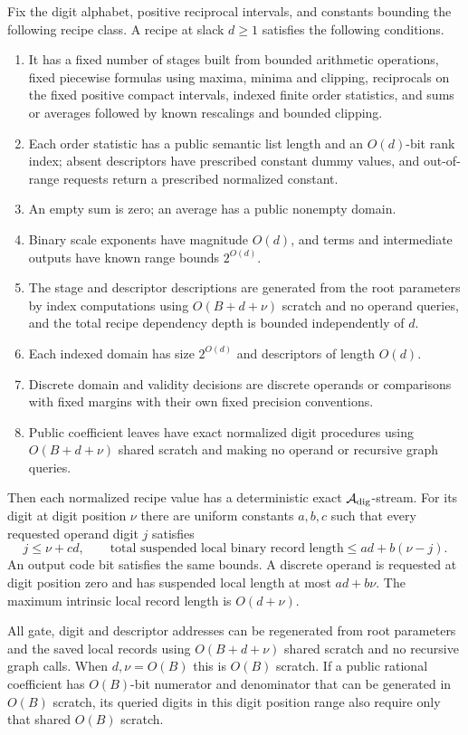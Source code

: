 \begin{theorem}
\label{thm:arith-interface}
Fix the digit alphabet, positive reciprocal intervals, and
constants bounding the following recipe class.  A recipe at
slack $d\geq1$ satisfies the following conditions.
\begin{enumerate}
\item It has a fixed number of stages built from bounded
arithmetic operations, fixed piecewise formulas using maxima,
minima and clipping, reciprocals on the fixed positive compact
intervals, indexed finite order statistics, and sums or averages followed by known
rescalings and bounded clipping.
\item Each order statistic has a public semantic list
length and an $O(d)$-bit rank index; absent descriptors have prescribed
constant dummy values, and out-of-range requests return a prescribed
normalized constant.
\item An empty sum is zero; an average has a public
nonempty domain.
\item Binary scale exponents have magnitude $O(d)$, and
terms and intermediate outputs have known range bounds $2^{O(d)}$.
\item The stage and descriptor
descriptions are generated from the root parameters by index
computations using $O(B+d+\nu)$ scratch and no operand queries, and the
total recipe dependency depth is bounded independently
of $d$.
\item Each indexed domain has size $2^{O(d)}$ and descriptors
of length $O(d)$.
\item Discrete domain and validity decisions are
discrete operands or comparisons with fixed margins with their own fixed
precision conventions.
\item Public coefficient leaves have exact
normalized digit procedures using $O(B+d+\nu)$ shared scratch
and making no operand or recursive graph queries.
\end{enumerate}

Then each normalized recipe value has a deterministic exact
$\mathcal A_{\rm dig}$-stream.  For its digit at digit position $\nu$ there are uniform
constants $a,b,c$ such that every requested operand digit $j$
satisfies
\begin{equation}
 j\leq \nu+cd,\qquad
 \text{total suspended local binary record length}
       \leq ad+b(\nu-j).
 \label{eq:arith-export}
\end{equation}
An output code bit satisfies the same bounds.  A discrete operand
is requested at digit position zero and has suspended local length at
most $ad+b\nu$.  The maximum intrinsic local record length is
$O(d+\nu)$.

All gate, digit and descriptor addresses can be regenerated from
root parameters and the saved local records using
$O(B+d+\nu)$ shared scratch and no recursive graph calls.  When
$d,\nu=O(B)$ this is $O(B)$ scratch.  If a public rational
coefficient has $O(B)$-bit numerator and denominator that can
be generated in $O(B)$ scratch, its queried digits in this digit position
range also require only that shared $O(B)$ scratch.
\end{theorem}

